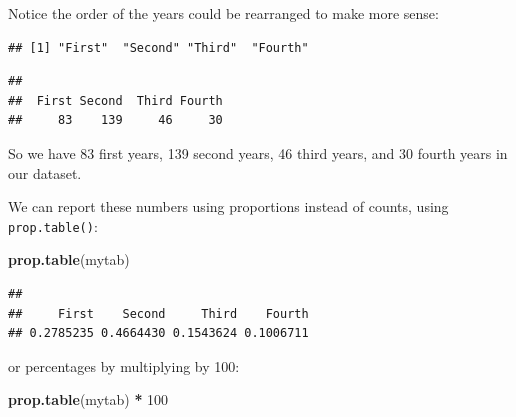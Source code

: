 \documentclass[
]{book}
\newenvironment{Shaded}{\begin{snugshade}}{\end{snugshade}}
\newcommand{\AttributeTok}[1]{\textcolor[rgb]{0.13,0.29,0.53}{#1}}
\newcommand{\DecValTok}[1]{\textcolor[rgb]{0.00,0.00,0.81}{#1}}
\newcommand{\FunctionTok}[1]{\textcolor[rgb]{0.13,0.29,0.53}{\textbf{#1}}}
\newcommand{\NormalTok}[1]{#1}
\newcommand{\OtherTok}[1]{\textcolor[rgb]{0.56,0.35,0.01}{#1}}
\newcommand{\SpecialCharTok}[1]{\textcolor[rgb]{0.81,0.36,0.00}{\textbf{#1}}}
\newcommand{\StringTok}[1]{\textcolor[rgb]{0.31,0.60,0.02}{#1}}
\begin{document}
Notice the order of the years could be rearranged to make more sense:

\begin{Shaded}
\end{Shaded}

\begin{verbatim}
## [1] "First"  "Second" "Third"  "Fourth"
\end{verbatim}

\begin{Shaded}
\end{Shaded}

\begin{verbatim}
## 
##  First Second  Third Fourth 
##     83    139     46     30
\end{verbatim}

So we have 83 first years, 139 second years, 46 third years, and 30 fourth years in our dataset.

We can report these numbers using proportions instead of counts, using \texttt{prop.table()}:

\begin{Shaded}
\begin{Highlighting}[]
\FunctionTok{prop.table}\NormalTok{(mytab)}
\end{Highlighting}
\end{Shaded}

\begin{verbatim}
## 
##     First    Second     Third    Fourth 
## 0.2785235 0.4664430 0.1543624 0.1006711
\end{verbatim}

or percentages by multiplying by 100:

\begin{Shaded}
\begin{Highlighting}[]
\FunctionTok{prop.table}\NormalTok{(mytab) }\SpecialCharTok{*} \DecValTok{100}
\end{Highlighting}
\end{Shaded}
\end{document}
